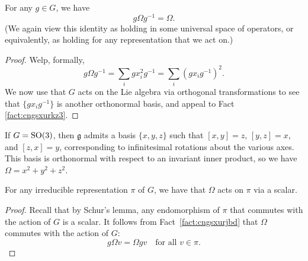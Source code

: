 \documentclass[reqno]{amsart} 
\begin{document}
\begin{fact}\label{fact:cngsxurjbd}
  For any $g \in G$, we have
  \begin{equation*}
    g \Omega g^{-1} = \Omega.
  \end{equation*}
  (We again view this identity as holding in some universal space of operators, or equivalently, as holding for any representation that we act on.)
\end{fact}
\begin{proof}
  Welp, formally,
  \begin{equation*}
    g \Omega g^{-1} = \sum_i g x_i^2 g^{-1} = \sum_i (g x_i g^{-1})^2.
  \end{equation*}
  We now use that $G$ acts on the Lie algebra via orthogonal transformations to see that $\{g x_i g^{-1}\}$ is another orthonormal basis, and appeal to Fact \ref{fact:cngsxurkz3}.
\end{proof}

\begin{example}\label{example:cngsxuwa7f}
  If $G = \operatorname{SO}(3)$, then $\mathfrak{g}$ admits a basis $\{x, y, z\}$ such that $[x,y] = z$, $[y,z] = x$, and $[z,x] = y$, corresponding to infinitesimal rotations about the various axes.  This basis is orthonormal with respect to an invariant inner product, so we have $\Omega = x^2 + y^2 + z^2$.
\end{example}

\begin{fact}
  For any irreducible representation $\pi$ of $G$, we have that $\Omega$ acts on $\pi$ via a scalar.
\end{fact}
\begin{proof}
  Recall that by Schur's lemma, any endomorphism of $\pi$ that commutes with the action of $G$ is a scalar.  It follows from Fact~\ref{fact:cngsxurjbd} that $\Omega$ commutes with the action of $G$:
  \begin{equation*}
    g \Omega v = \Omega g v \quad \text{for all } v \in \pi.
  \end{equation*}
\end{proof}


{} 
\end{document}
